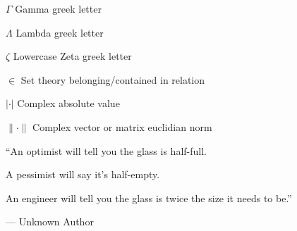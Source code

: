 \documentclass{apaThesis}
\begin{document}
\begingroup
	\makeatletter
		\def\chapter{\cleardoublepage\secdef\@chapter\@schapter}
		\def\@makeschapterhead#1{{\center\HUGE\sffamily\bfseries #1\par\nobreak\vskip 10\p@\vspace*{5mm} }}
	\makeatother

\begin{acronyms}
\end{acronyms}

\begin{listofsymbols}
	\item[$ \Gamma $] Gamma greek letter
	\item[$ \Lambda $] Lambda greek letter
	\item[$ \zeta $] Lowercase Zeta greek letter
	\item[$ \in $] Set theory belonging/contained in relation
	\item[$|\cdot|$] Complex absolute value
	\item[$\lVert \cdot \rVert$] Complex vector or matrix euclidian norm
\end{listofsymbols}

\endgroup


\tableofcontents*
\cleardoublepage

\pagestyle{fancy}


\begin{newepigraph}
``An optimist will tell you the glass is half-full.
				
A pessimist will say it's half-empty.

An engineer will tell you the glass is twice the size it needs to be.''

\hfill --- Unknown Author
\end{newepigraph}
\end{document}
